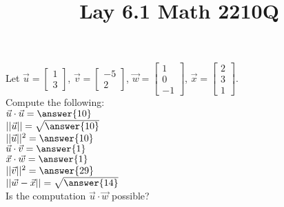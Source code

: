 \documentclass{ximera}
\begin{document}
  	\title{Lay 6.1  \hfill Math 2210Q} 
  	  		    \begin{question} Let $\vec{u} = \begin{bmatrix} 1\\3\end{bmatrix}$, $\vec{v} = \begin{bmatrix} -5\\2\end{bmatrix}$, $\vec{w} = \begin{bmatrix} 1\\0\\-1\end{bmatrix}$, $\vec{x} = \begin{bmatrix} 2\\3\\1\end{bmatrix}$.\\ Compute the following:\\
  	  		    	
  	  		$\vec{u} \cdot \vec{u} = \answer{10}$\vspace{10pt}\\
  	  		$||\vec{u}|| = \sqrt{\answer{10}}$\vspace{10pt}\\
  	  		$||\vec{u}||^2 = \answer{10}$\vspace{10pt}\\
  	  		$\vec{u} \cdot \vec{v} = \answer{1}$\vspace{10pt}\\
  	  		$\vec{x}\cdot \vec{w} = \answer{1}$\vspace{10pt}\\
  	  		$||\vec{v}||^2 = \answer{29}$\vspace{10pt}\\
  	  		$||\vec{w} - \vec{x}|| = \sqrt{\answer{14}}$\vspace{10pt}\\
  	  		
  	  		
  	  		
  	  		Is the computation $\vec{u} \cdot \vec{w}$ possible?
  	  \begin{multipleChoice}
  	  \end{multipleChoice}
  	  		    	
  	  		    \end{question}	
\end{document}
